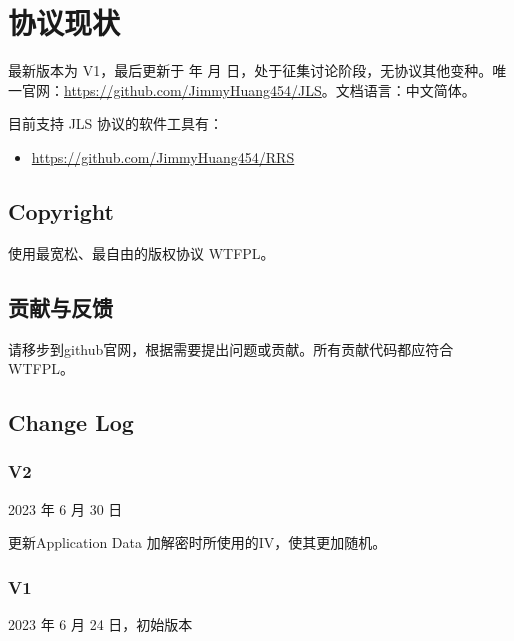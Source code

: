 \renewcommand{\today}{\number\year 年 \number\month 月 \number\day 日}

\chapter{协议现状}

最新版本为 V1，最后更新于 \today，处于征集讨论阶段，无协议其他变种。唯一官网：\href{https://github.com/JimmyHuang454/JLS}{https://github.com/JimmyHuang454/JLS}。文档语言：中文简体。

目前支持 JLS 协议的软件工具有：
\begin{itemize}
	\item \href{https://github.com/JimmyHuang454/RRS}{https://github.com/JimmyHuang454/RRS}
\end{itemize}



\section{Copyright}
使用最宽松、最自由的版权协议 WTFPL。

\section{贡献与反馈}
请移步到github官网，根据需要提出问题或贡献。所有贡献代码都应符合 WTFPL。

\section{Change Log}
\subsection{V2}
2023 年 6 月 30 日

更新Application Data 加解密时所使用的IV，使其更加随机。


\subsection{V1}
2023 年 6 月 24 日，初始版本
